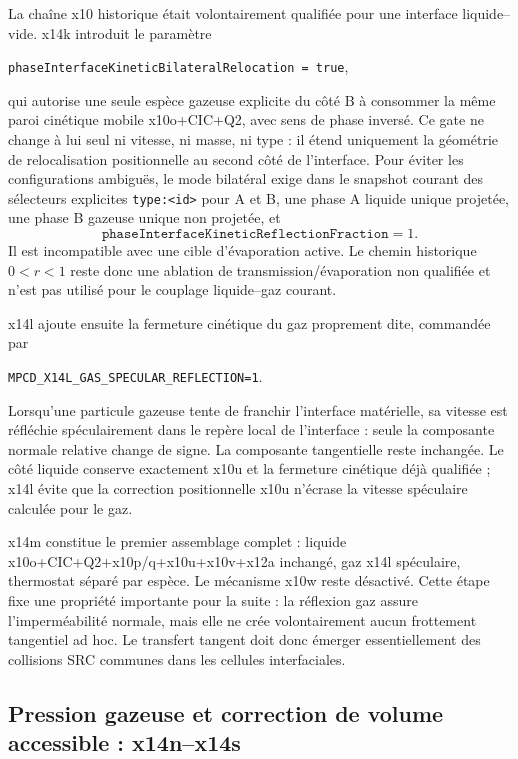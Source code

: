 \documentclass[11pt,a4paper]{article}
\begin{document}
La chaîne x10 historique était volontairement qualifiée pour une interface liquide--vide. x14k introduit le paramètre
\begin{center}
\small
\nolinkurl{phaseInterfaceKineticBilateralRelocation = true},
\end{center}
qui autorise une seule espèce gazeuse explicite du côté B à consommer la même paroi cinétique mobile x10o+CIC+Q2, avec sens de phase inversé. Ce gate ne change à lui seul ni vitesse, ni masse, ni type : il étend uniquement la géométrie de relocalisation positionnelle au second côté de l'interface. Pour éviter les configurations ambiguës, le mode bilatéral exige dans le snapshot courant des sélecteurs explicites \nolinkurl{type:<id>} pour A et B, une phase A liquide unique projetée, une phase B gazeuse unique non projetée, et
\begin{equation}
  \texttt{phaseInterfaceKineticReflectionFraction}=1.
\end{equation}
Il est incompatible avec une cible d'évaporation active. Le chemin historique $0<r<1$ reste donc une ablation de transmission/évaporation non qualifiée et n'est pas utilisé pour le couplage liquide--gaz courant.

x14l ajoute ensuite la fermeture cinétique du gaz proprement dite, commandée par
\begin{center}
\small
\nolinkurl{MPCD_X14L_GAS_SPECULAR_REFLECTION=1}.
\end{center}
Lorsqu'une particule gazeuse tente de franchir l'interface matérielle, sa vitesse est réfléchie spéculairement dans le repère local de l'interface : seule la composante normale relative change de signe. La composante tangentielle reste inchangée. Le côté liquide conserve exactement x10u et la fermeture cinétique déjà qualifiée ; x14l évite que la correction positionnelle x10u n'écrase la vitesse spéculaire calculée pour le gaz.

x14m constitue le premier assemblage complet : liquide x10o+CIC+Q2+x10p/q+x10u+x10v+x12a inchangé, gaz x14l spéculaire, thermostat séparé par espèce. Le mécanisme x10w reste désactivé. Cette étape fixe une propriété importante pour la suite : la réflexion gaz assure l'imperméabilité normale, mais elle ne crée volontairement aucun frottement tangentiel ad hoc. Le transfert tangent doit donc émerger essentiellement des collisions SRC communes dans les cellules interfaciales.

\subsection{Pression gazeuse et correction de volume accessible : x14n--x14s}
\end{document}
